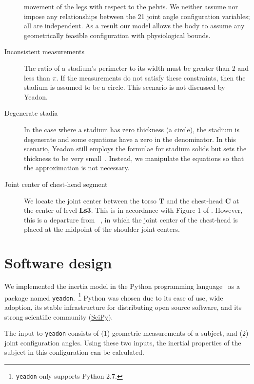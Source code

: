 \documentclass[10pt,a4paper,twocolumn]{article}
\begin{document}
\begin{description}
      movement of the legs with respect to the pelvis. We neither assume nor
      impose any relationships between the 21 joint angle configuration
      variables; all are independent. As a result our model allows the body to
      assume any geometrically feasible configuration with physiological
      bounds.
    \item[Inconsistent measurements] The ratio of a stadium's perimeter to its
      width must be greater than 2 and less than $\pi$. If the measurements do
      not satisfy these constraints, then the stadium is assumed to be a
      circle. This scenario is not discussed by Yeadon.
    \item[Degenerate stadia] In the case where a stadium has zero thickness (a
      circle), the stadium is degenerate and some equations have a zero in the
      denominator. In this scenario, Yeadon still employs the formulae for
      stadium solids but sets the thickness to be very
      small~\cite{Yeadon1990f}.  Instead, we manipulate the equations so that
      the approximation is not necessary.
    \item[Joint center of chest-head segment] We locate the joint center
      between the torso \textbf{T} and the chest-head \textbf{C} at the center
      of level \textbf{Ls3}. This is in accordance with Figure 1 of
      \cite{Yeadon1990e}. However, this is a departure from
      ~\cite{Yeadon1984a}, in which the joint center of the chest-head is
      placed at the midpoint of the shoulder joint centers.
\end{description}

\section*{Software design}

We implemented the inertia model in the Python programming
language~\cite{Python2014} as a package named
\verb+yeadon+.~\cprotect\footnote{\verb+yeadon+ only supports Python 2.7.}
Python was chosen due to its ease of use, wide adoption, its stable
infrastructure for distributing open source software, and its strong scientific
community (\href{http://www.scipy.org}{SciPy}).

The input to \verb+yeadon+ consists of (1) geometric measurements of a subject,
and (2) joint configuration angles. Using these two inputs, the inertial
properties of the subject in this configuration can be calculated.
\end{document}

